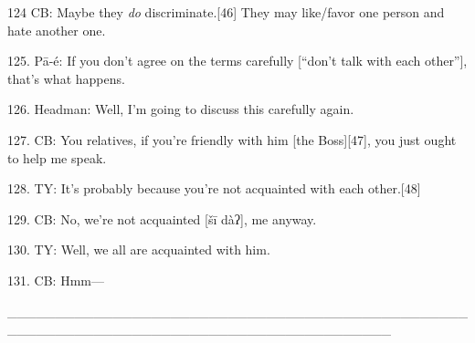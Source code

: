 124 CB: Maybe they \textit{do} discriminate.[46]  They may like/favor one person
and hate another one.

125. Pā-é: If you don't agree on the terms carefully [``don't talk with each
other''], that's what happens.

126. Headman: Well, I'm going to discuss this carefully again.

127. CB: You relatives, if you're friendly with him [the Boss][47], you just ought
to help me speak.

128. TY: It's probably because you're not acquainted with each other.[48]

129. CB: No, we're not acquainted [šī dàʔ], me anyway.

130. TY: Well, we all are acquainted with him.

131. CB: Hmm---

\_\_\_\_\_\_\_\_\_\_\_\_\_\_\_\_\_\_\_\_\_\_\_\_\_\_\_\_\_\_\_\_\_\_\_\_\_\_\_\_\_\_\_\_\_\_\_\_\_\_\_\_\_\_\_\_\_\_\_\_\_\_\_\_\_\_\_\_\_\_\_\_\_\_\_\_\_\_\_\_\_\_\_\_\_\_\_\_

